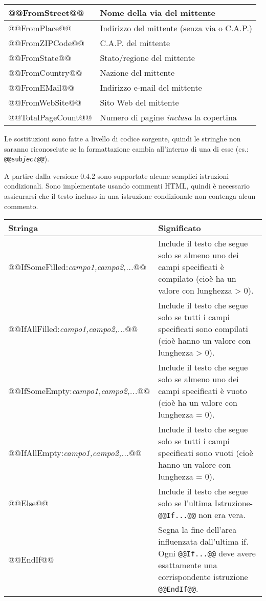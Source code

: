 \documentclass[a4paper,10pt]{scrartcl}
\begin{document}
\begin{center}
\begin{tabular}{|l|p{}|}
\ttfamily @@FromStreet@@ & Nome della via del mittente \\\hline
\ttfamily @@FromPlace@@ & Indirizzo del mittente (senza via o C.A.P.)\\\hline
\ttfamily @@FromZIPCode@@ & C.A.P. del mittente \\\hline
\ttfamily @@FromState@@ & Stato/regione del mittente\\\hline
\ttfamily @@FromCountry@@ & Nazione del mittente\\\hline
\ttfamily @@FromEMail@@ & Indirizzo e-mail del mittente\\\hline
\ttfamily @@FromWebSite@@ & Sito Web del mittente\\\hline
\ttfamily @@TotalPageCount@@ & Numero di pagine \textit{inclusa} la copertina \\\hline
\end{tabular}
\end{center}

Le sostituzioni sono fatte a livello di codice sorgente, quindi le stringhe non saranno riconosciute se la formattazione cambia all'interno di una di esse (es.: \texttt{@@sub\textit{ject@@}}).

A partire dalla versione 0.4.2 sono supportate alcune semplici istruzioni condizionali. Sono implementate usando commenti HTML, quindi è necessario assicurarsi che il testo incluso in una istruzione condizionale non contenga alcun commento.
\begin{center}
\begin{tabular}{|l|p{}|}
\hline
\bfseries Stringa & \bfseries Significato \\
\hline\hline
\ttfamily @@IfSomeFilled:\textit{campo1,campo2,...}@@ & Include il testo che segue solo se almeno uno dei campi specificati è compilato (cioè ha un valore con lunghezza > 0).\\\hline
\ttfamily @@IfAllFilled:\textit{campo1,campo2,...}@@ & Include il testo che segue solo se tutti i campi specificati sono compilati (cioè hanno un valore con lunghezza > 0).\\\hline
\ttfamily @@IfSomeEmpty:\textit{campo1,campo2,...}@@ & Include il testo che segue solo se almeno uno dei campi specificati è vuoto (cioè ha un valore con lunghezza = 0).\\\hline
\ttfamily @@IfAllEmpty:\textit{campo1,campo2,...}@@ & Include il testo che segue solo se tutti i campi specificati sono vuoti (cioè hanno un valore con lunghezza = 0).\\\hline
\ttfamily @@Else@@ & Include il testo che segue solo se l'ultima Istruzione-\texttt{@@If...@@} non era vera.\\\hline
\ttfamily @@EndIf@@ & Segna la fine dell'area influenzata dall'ultima if. Ogni \texttt{@@If...@@} deve avere esattamente una corrispondente istruzione \texttt{@@EndIf@@}.\\\hline
\end{tabular}
\end{center}
\end{document}
